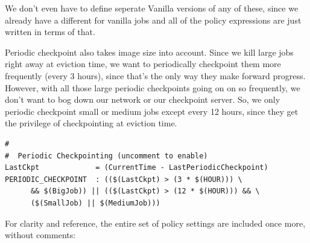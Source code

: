 We don't even have to define seperate Vanilla versions of any of
these, since we already have a different  for
vanilla jobs and all of the policy expressions are just written in
terms of that. 

Periodic checkpoint also takes image size into account.  Since we kill
large jobs right away at eviction time, we want to periodically
checkpoint them more frequently (every 3 hours), since that's the only
way they make forward progress.  However, with all those large
periodic checkpoints going on on so frequently, we don't want to bog
down our network or our checkpoint server.  So, we only periodic
checkpoint small or medium jobs except every 12 hours, since they get the
privilege of checkpointing at eviction time.

\begin{verbatim}
#
#  Periodic Checkpointing (uncomment to enable)
LastCkpt             = (CurrentTime - LastPeriodicCheckpoint)
PERIODIC_CHECKPOINT  : (($(LastCkpt) > (3 * $(HOUR))) \
      && $(BigJob)) || (($(LastCkpt) > (12 * $(HOUR))) && \
      ($(SmallJob) || $(MediumJob)))
\end{verbatim}

For clarity and reference, the entire set of policy settings are
included once more, without comments:

